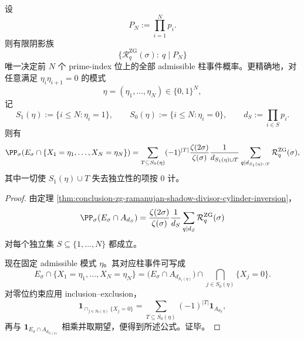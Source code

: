 \begin{theorem}\label{thm:conclusion-zg-finite-primorial-shadow-cylinder-recovery}
设
\[
P_N:=\prod_{i=1}^{N}p_i.
\]
则有限阴影族
\[
\{\mathcal R_q^{\mathrm{ZG}}(\sigma):\ q\mid P_N\}
\]
唯一决定前 \(N\) 个 prime-index 位上的全部 admissible 柱事件概率。更精确地，对任意满足 \(\eta_i\eta_{i+1}=0\) 的模式
\[
\eta=(\eta_1,\dots,\eta_N)\in\{0,1\}^N,
\]
记
\[
S_1(\eta):=\{i\le N:\eta_i=1\},
\qquad
S_0(\eta):=\{i\le N:\eta_i=0\},
\qquad
d_S:=\prod_{i\in S}p_i.
\]
则有
\[
\PP_\sigma\!\left(E_\sigma\cap\{X_1=\eta_1,\dots,X_N=\eta_N\}\right)
=
\sum_{T\subseteq S_0(\eta)}(-1)^{|T|}
\frac{\zeta(2\sigma)}{\zeta(\sigma)}
\frac{1}{d_{S_1(\eta)\cup T}}
\sum_{q\mid d_{S_1(\eta)\cup T}}\mathcal R_q^{\mathrm{ZG}}(\sigma),
\]
其中一切使 \(S_1(\eta)\cup T\) 失去独立性的项按 \(0\) 计。
\end{theorem}
\begin{proof}
由定理 \ref{thm:conclusion-zg-ramanujan-shadow-divisor-cylinder-inversion}，
\[
\PP_\sigma(E_\sigma\cap A_{d_S})
=
\frac{\zeta(2\sigma)}{\zeta(\sigma)}
\frac{1}{d_S}
\sum_{q\mid d_S}\mathcal R_q^{\mathrm{ZG}}(\sigma)
\]
对每个独立集 \(S\subseteq\{1,\dots,N\}\) 都成立。

现在固定 admissible 模式 \(\eta\)。其对应柱事件可写成
\[
E_\sigma\cap\{X_1=\eta_1,\dots,X_N=\eta_N\}
=
\bigl(E_\sigma\cap A_{d_{S_1(\eta)}}\bigr)\cap\bigcap_{j\in S_0(\eta)}\{X_j=0\}.
\]
对零位约束应用 inclusion--exclusion，
\[
\mathbf 1_{\cap_{j\in S_0(\eta)}\{X_j=0\}}
=
\sum_{T\subseteq S_0(\eta)}(-1)^{|T|}\mathbf 1_{A_{d_T}},
\]
再与 \(\mathbf 1_{E_\sigma\cap A_{d_{S_1(\eta)}}}\) 相乘并取期望，便得到所述公式。证毕。
\end{proof}

